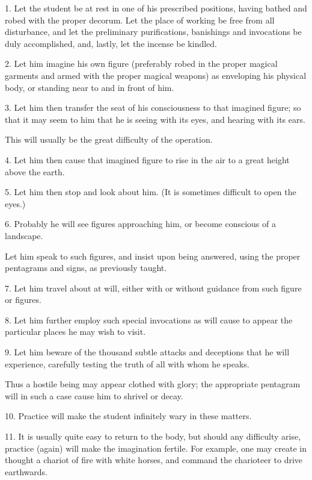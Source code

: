 

1. Let the student be at rest in one of his prescribed positions, having bathed and robed with the proper decorum. Let the place of working be free from all disturbance, and let the preliminary purifications, banishings and invocations be duly accomplished, and, lastly, let the incense be kindled.

2. Let him imagine his own figure (preferably robed in the proper magical garments and armed with the proper magical weapons) as enveloping his physical body, or standing near to and in front of him.

3. Let him then transfer the seat of his consciousness to that imagined figure; so that it may seem to him that he is seeing with its eyes, and hearing with its ears.

This will usually be the great difficulty of the operation.

4. Let him then cause that imagined figure to rise in the air to a great height above the earth.

5. Let him then stop and look about him. (It is sometimes difficult to open the eyes.)

6. Probably he will see figures approaching him, or become conscious of a landscape.

Let him speak to such figures, and insist upon being answered, using the proper pentagrams and signs, as previously taught.

7. Let him travel about at will, either with or without guidance from such figure or figures.

8. Let him further employ such special invocations as will cause to appear the particular places he may wish to visit.

9. Let him beware of the thousand subtle attacks and deceptions that he will experience, carefully testing the truth of all with whom he speaks.

Thus a hostile being may appear clothed with glory; the appropriate pentagram will in such a case cause him to shrivel or decay.

10. Practice will make the student infinitely wary in these matters.

11. It is usually quite easy to return to the body, but should any difficulty arise, practice (again) will make the imagination fertile. For example, one may create in thought a chariot of fire with white horses, and command the charioteer to drive earthwards.

